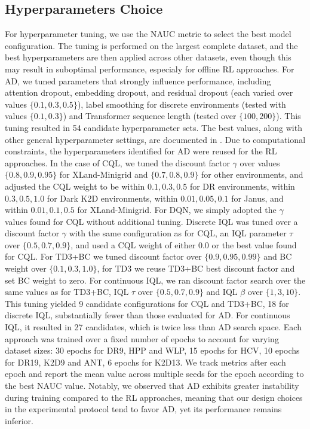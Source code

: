 \documentclass{article}
\begin{document}
\subsection{Hyperparameters Choice}
For hyperparameter tuning, we use the NAUC metric to select the best model configuration. The tuning is performed on the largest complete dataset, and the best hyperparameters are then applied across other datasets, even though this may result in suboptimal performance, especialy for offline RL approaches.
For AD, we tuned parameters that strongly influence performance, including attention dropout, embedding dropout, and residual dropout (each varied over values $\{0.1, 0.3, 0.5\}$), label smoothing for discrete environments (tested with values $\{0.1, 0.3\}$) and Transformer sequence length (tested over $\{100, 200\}$). This tuning resulted in 54 candidate hyperparameter sets. The best values, along with other general hyperparameter settings, are documented in .
Due to computational constraints, the hyperparameters identified for AD were reused for the RL approaches. In the case of CQL, we tuned the discount factor $\gamma$ over values $\{0.8, 0.9, 0.95\}$ for XLand-Minigrid and $\{0.7, 0.8, 0.9\}$ for other environments, and adjusted the CQL weight to be within ${0.1, 0.3, 0.5}$ for DR environments, within ${0.3, 0.5, 1.0}$ for Dark K2D environments, within ${0.01, 0.05, 0.1}$ for Janus, and within ${0.01, 0.1, 0.5}$ for XLand-Minigrid. For DQN, we simply adopted the $\gamma$ values found for CQL without additional tuning. Discrete IQL was tuned over a discount factor $\gamma$ with the same configuration as for CQL, an IQL parameter $\tau$ over $\{0.5, 0.7, 0.9\}$, and used a CQL weight of either $0.0$ or the best value found for CQL. For TD3+BC we tuned discount factor over $\{0.9, 0.95, 0.99\}$ and BC weight over $\{0.1, 0.3, 1.0\}$, for TD3 we reuse TD3+BC best discount factor and set BC weight to zero. For continuous IQL, we ran discount factor search over the same values as for TD3+BC, IQL $\tau$ over $\{0.5, 0.7, 0.9\}$ and IQL $\beta$ over $\{1, 3, 10\}$. This tuning yielded 9 candidate configurations for CQL and TD3+BC, 18 for discrete IQL, substantially fewer than those evaluated for AD. For continuous IQL, it resulted in 27 candidates, which is twice less than AD search space.
Each approach was trained over a fixed number of epochs to account for varying dataset sizes: 30 epochs for DR9, HPP and WLP, 15 epochs for HCV, 10 epochs for DR19, K2D9 and ANT, 6 epochs for K2D13. We track metrics after each epoch and report the mean value across multiple seeds for the epoch according to the best NAUC value. Notably, we observed that AD exhibits greater instability during training compared to the RL approaches, meaning that our design choices in the experimental protocol tend to favor AD, yet its performance remains inferior.
\end{document}
